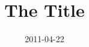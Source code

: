 \documentclass[12pt]{article}
\title{ The Title }
\author{\MyFullName}
\date{2011-04-22}
\begin{document}
\maketitle
\thispagestyle{empty}
\begin{center}
\end{center}
\setcounter{page}{0}
\newpage

\end{document}
